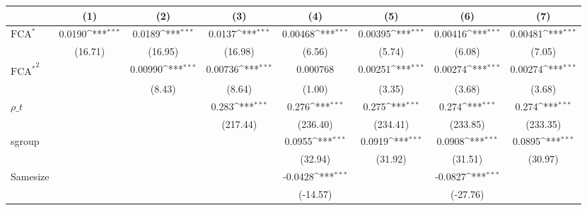 {
\def\sym#1{\ifmmode^{#1}\else\(^{#1}\)\fi}
\begin{tabular}{l*{7}{c}}
\hline\hline
                    &\multicolumn{1}{c}{(1)}         &\multicolumn{1}{c}{(2)}         &\multicolumn{1}{c}{(3)}         &\multicolumn{1}{c}{(4)}         &\multicolumn{1}{c}{(5)}         &\multicolumn{1}{c}{(6)}         &\multicolumn{1}{c}{(7)}         \\
\hline
$ \text{FCA}^* $    &      0.0190\sym{***}&      0.0189\sym{***}&      0.0137\sym{***}&     0.00468\sym{***}&     0.00395\sym{***}&     0.00416\sym{***}&     0.00481\sym{***}\\
                    &     (16.71)         &     (16.95)         &     (16.98)         &      (6.56)         &      (5.74)         &      (6.08)         &      (7.05)         \\
[1em]
 $ { \text{FCA} ^ * } ^2 $&                     &     0.00990\sym{***}&     0.00736\sym{***}&    0.000768         &     0.00251\sym{***}&     0.00274\sym{***}&     0.00274\sym{***}\\
                    &                     &      (8.43)         &      (8.64)         &      (1.00)         &      (3.35)         &      (3.68)         &      (3.68)         \\
[1em]
$ \rho\_t $          &                     &                     &       0.283\sym{***}&       0.276\sym{***}&       0.275\sym{***}&       0.274\sym{***}&       0.274\sym{***}\\
                    &                     &                     &    (217.44)         &    (236.40)         &    (234.41)         &    (233.85)         &    (233.35)         \\
[1em]
sgroup              &                     &                     &                     &      0.0955\sym{***}&      0.0919\sym{***}&      0.0908\sym{***}&      0.0895\sym{***}\\
                    &                     &                     &                     &     (32.94)         &     (31.92)         &     (31.51)         &     (30.97)         \\
[1em]
Samesize            &                     &                     &                     &     -0.0428\sym{***}&                     &     -0.0827\sym{***}&                     \\
                    &                     &                     &                     &    (-14.57)         &                     &    (-27.76)         &                     \\

\end{tabular}}
